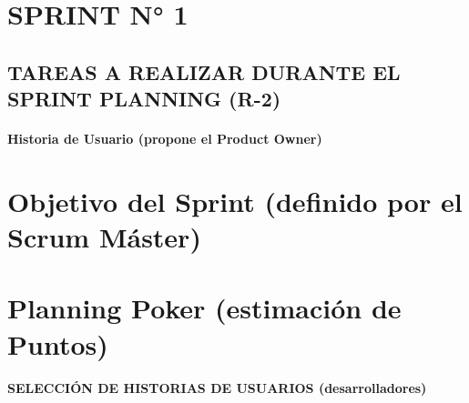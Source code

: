\begin{doublespace} 


    \renewcommand{\arraystretch}{1.6} %


\section{SPRINT N° 1}
\subsection{TAREAS A REALIZAR DURANTE EL SPRINT PLANNING (R-2)}

\paragraph{\Large\textbf {Historia de Usuario (propone el Product Owner)}}



\clearpage  %
\section{Objetivo del Sprint (definido por el Scrum Máster)}



\section{Planning Poker (estimación de Puntos)}



\clearpage  %
\paragraph{\large\textbf {SELECCIÓN DE HISTORIAS DE USUARIOS (desarrolladores)}}



\end{doublespace}
